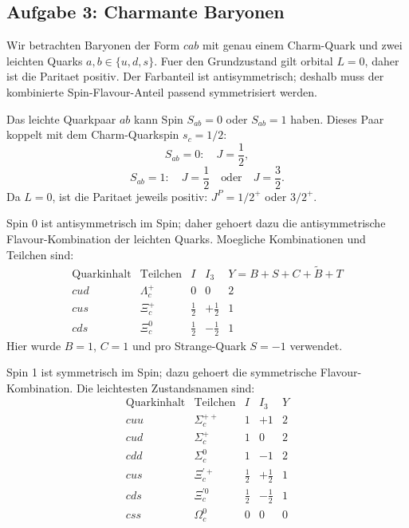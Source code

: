 \documentclass[11pt,a4paper]{scrartcl}
\begin{document}
\subsection{Aufgabe 3: Charmante Baryonen}
\begin{learningbox}
Wir betrachten Baryonen der Form \(cab\) mit genau einem Charm-Quark und zwei leichten Quarks \(a,b\in\{u,d,s\}\). Fuer den Grundzustand gilt orbital \(L=0\), daher ist die Paritaet positiv. Der Farbanteil ist antisymmetrisch; deshalb muss der kombinierte Spin-Flavour-Anteil passend symmetrisiert werden.
\end{learningbox}

\begin{calculationbox}[title={(a) Einteilung nach Spin des leichten Quarkpaars}]
Das leichte Quarkpaar \(ab\) kann Spin \(S_{ab}=0\) oder \(S_{ab}=1\) haben. Dieses Paar koppelt mit dem Charm-Quarkspin \(s_c=1/2\):
\[
S_{ab}=0:\quad J=\frac12,
\]
\[
S_{ab}=1:\quad J=\frac12\quad\text{oder}\quad J=\frac32.
\]
Da \(L=0\), ist die Paritaet jeweils positiv: \(J^P=1/2^+\) oder \(3/2^+\).
\end{calculationbox}

\begin{calculationbox}[title={Gruppe (i): \(J^P=\frac12^+\), leichtes Paar mit Spin 0}]
Spin 0 ist antisymmetrisch im Spin; daher gehoert dazu die antisymmetrische Flavour-Kombination der leichten Quarks. Moegliche Kombinationen und Teilchen sind:
\[
\begin{array}{c|c|c|c|c}
\text{Quarkinhalt} & \text{Teilchen} & I & I_3 & Y=B+S+C+\tilde B+T\\\hline
cud & \Lambda_c^+ & 0 & 0 & 2\\
cu s & \Xi_c^+ & \frac12 & +\frac12 & 1\\
cd s & \Xi_c^0 & \frac12 & -\frac12 & 1
\end{array}
\]
Hier wurde \(B=1\), \(C=1\) und pro Strange-Quark \(S=-1\) verwendet.
\end{calculationbox}

\begin{calculationbox}[title={Gruppe (ii): \(J^P=\frac12^+\), leichtes Paar mit Spin 1}]
Spin 1 ist symmetrisch im Spin; dazu gehoert die symmetrische Flavour-Kombination. Die leichtesten Zustandsnamen sind:
\[
\begin{array}{c|c|c|c|c}
\text{Quarkinhalt} & \text{Teilchen} & I & I_3 & Y\\\hline
cuu & \Sigma_c^{++} & 1 & +1 & 2\\
cud & \Sigma_c^+ & 1 & 0 & 2\\
cdd & \Sigma_c^0 & 1 & -1 & 2\\
cu s & \Xi_c^{\prime +} & \frac12 & +\frac12 & 1\\
cd s & \Xi_c^{\prime 0} & \frac12 & -\frac12 & 1\\
css & \Omega_c^0 & 0 & 0 & 0
\end{array}
\]
\end{calculationbox}
\end{document}
